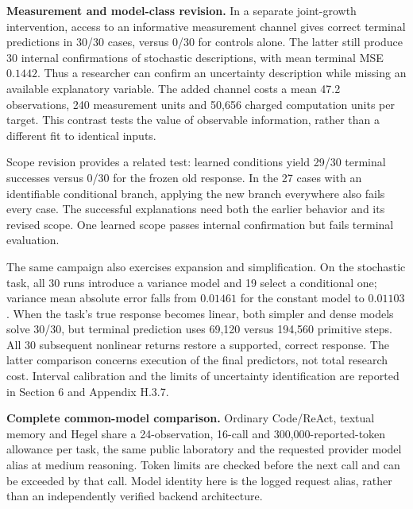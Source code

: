 \documentclass[twoside,11pt]{article}
\begin{document}
\textbf{Measurement and model-class revision.} In a separate joint-growth intervention, access to an informative measurement channel gives correct terminal predictions in 30/30 cases, versus 0/30 for controls alone. The latter still produce 30 internal confirmations of stochastic descriptions, with mean terminal MSE \(0.1442\). Thus a researcher can confirm an uncertainty description while missing an available explanatory variable. The added channel costs a mean 47.2 observations, 240 measurement units and 50,656 charged computation units per target. This contrast tests the value of observable information, rather than a different fit to identical inputs.


Scope revision provides a related test: learned conditions yield 29/30 terminal successes versus 0/30 for the frozen old response. In the 27 cases with an identifiable conditional branch, applying the new branch everywhere also fails every case. The successful explanations need both the earlier behavior and its revised scope. One learned scope passes internal confirmation but fails terminal evaluation.


The same campaign also exercises expansion and simplification. On the stochastic task, all 30 runs introduce a variance model and 19 select a conditional one; variance mean absolute error falls from \(0.01461\) for the constant model to \(0.01103\). When the task's true response becomes linear, both simpler and dense models solve 30/30, but terminal prediction uses 69,120 versus 194,560 primitive steps. All 30 subsequent nonlinear returns restore a supported, correct response. The latter comparison concerns execution of the final predictors, not total research cost. Interval calibration and the limits of uncertainty identification are reported in Section 6 and Appendix H.3.7.


\textbf{Complete common-model comparison.} Ordinary Code/ReAct, textual memory and Hegel share a 24-observation, 16-call and 300,000-reported-token allowance per task, the same public laboratory and the requested provider model alias  at medium reasoning. Token limits are checked before the next call and can be exceeded by that call. Model identity here is the logged request alias, rather than an independently verified backend architecture.
\end{document}
